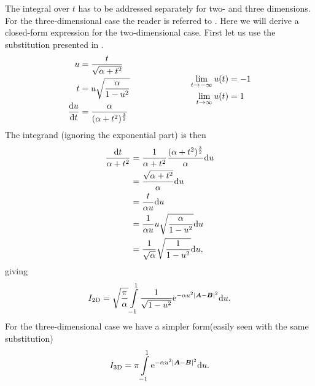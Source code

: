     The integral over $t$ has to be addressed separately for two- and three
    dimensions. For the three-dimensional case the reader is referred to
    \cite{HelgakerTaylorGauss}. Here we will derive a closed-form expression
    for the two-dimensional case. First let us use the substitution presented
    in .
        \begin{equation}
            \begin{aligned}
                u &= \frac{t}{\sqrt{\alpha+t^2}} \\
                t &= u\sqrt{\frac{\alpha}{1-u^2}} \\
                \frac{\mathrm{d} u}{\mathrm{d} t} &= \frac{\alpha}{(\alpha +
                t^2)^{\frac{3}{2}}}
            \end{aligned}
            \hspace{2.5cm}
            \begin{aligned}
                \lim\limits_{t\rightarrow -\infty} u(t) &= -1 \\ 
                \lim\limits_{t\rightarrow \infty} u(t) &= 1
            \end{aligned}
            \label{eq:uSubs1}
        \end{equation}
    The integrand (ignoring the exponential part) is then
        \begin{align}
            \frac{\mathrm{d} t}{\alpha + t^2} &= \frac{1}{\alpha + t^2} \frac{(\alpha +
            t^2)^{\frac{3}{2}}}{\alpha} \mathrm{d} u \nonumber \\
            &= \frac{\sqrt{\alpha + t^2}}{\alpha} \mathrm{d} u \nonumber \\
            &= \frac{t}{\alpha u} \mathrm{d} u \nonumber \\
            &= \frac{1}{\alpha u} u\sqrt{\frac{\alpha}{1-u^2}} \mathrm{d} u \nonumber \\
            &= \frac{1}{\sqrt{\alpha}}\sqrt{\frac{1}{1-u^2}} \mathrm{d} u,
        \end{align}
    giving
        \begin{align}
            I_{\text{2D}} = \sqrt{\frac{\pi}{\alpha}}\int\limits^1_{-1}
            \frac{1}{\sqrt{1-u^2}} \mathrm{e}^{-\alpha u^2\abs{\boldsymbol{{A}} - \boldsymbol{{B}}}^2}
            \mathrm{d} u.
            \label{eq:oneElectron2D}
        \end{align}
    For the three-dimensional case we have a simpler form(easily seen with the
    same substitution)
        \begin{align}
            I_{\text{3D}} = \pi\int\limits^1_{-1} \mathrm{e}^{-\alpha u^2\abs{\boldsymbol{{A}}
            - \boldsymbol{{B}}}^2} \mathrm{d} u.
            \label{eq:oneElectron3D}
        \end{align}
